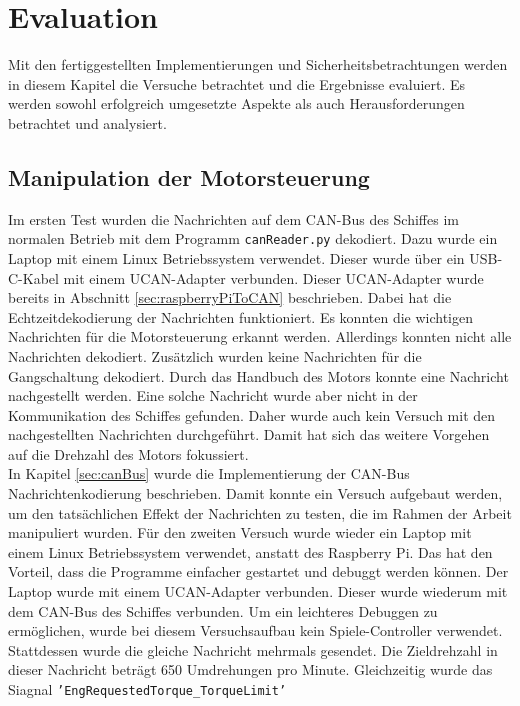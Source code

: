 \chapter{Evaluation}

Mit den fertiggestellten Implementierungen und Sicherheitsbetrachtungen werden in diesem Kapitel die
Versuche betrachtet und die Ergebnisse evaluiert. Es werden sowohl erfolgreich umgesetzte Aspekte als auch
Herausforderungen betrachtet und analysiert.

\section{Manipulation der Motorsteuerung} \label{sec:evManipulationMotor}
Im ersten Test wurden die Nachrichten auf dem CAN-Bus des Schiffes im normalen Betrieb mit dem Programm \texttt{canReader.py} 
dekodiert. Dazu wurde ein Laptop mit einem Linux Betriebssystem verwendet. Dieser wurde über ein USB-C-Kabel mit einem 
UCAN-Adapter verbunden. Dieser UCAN-Adapter wurde bereits in Abschnitt \ref{sec:raspberryPiToCAN} beschrieben. 
Dabei hat die Echtzeitdekodierung der Nachrichten funktioniert. Es konnten die wichtigen Nachrichten für die Motorsteuerung
erkannt werden. Allerdings konnten nicht alle Nachrichten dekodiert. Zusätzlich wurden keine Nachrichten für die Gangschaltung
dekodiert. Durch das Handbuch
des Motors konnte eine Nachricht nachgestellt werden. Eine solche Nachricht wurde aber nicht in der Kommunikation des 
Schiffes gefunden. Daher wurde auch kein Versuch mit den nachgestellten Nachrichten durchgeführt. Damit hat sich 
das weitere Vorgehen auf die Drehzahl des Motors fokussiert. \\
In Kapitel \ref{sec:canBus} wurde die Implementierung der CAN-Bus Nachrichtenkodierung beschrieben. 
Damit konnte ein Versuch
aufgebaut werden, um den tatsächlichen Effekt der Nachrichten zu testen, die im Rahmen der Arbeit manipuliert wurden. 
Für den zweiten Versuch wurde wieder ein Laptop mit einem Linux Betriebssystem verwendet, anstatt des Raspberry Pi. 
Das hat den Vorteil, dass
die Programme einfacher gestartet und debuggt werden können. Der Laptop wurde mit einem UCAN-Adapter verbunden.  
Dieser wurde wiederum mit dem CAN-Bus des Schiffes verbunden. Um ein leichteres Debuggen zu ermöglichen, wurde bei diesem 
Versuchsaufbau kein Spiele-Controller verwendet. Stattdessen wurde die gleiche Nachricht mehrmals gesendet. Die Zieldrehzahl in 
dieser Nachricht beträgt 650 Umdrehungen pro Minute. Gleichzeitig wurde das Siagnal \texttt{'EngRequestedTorque\_TorqueLimit'} 
